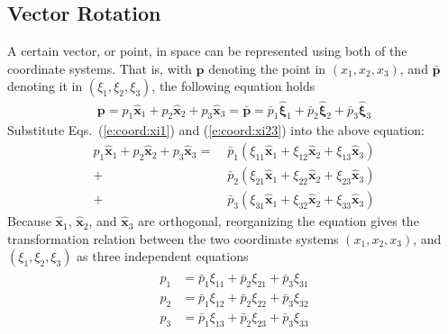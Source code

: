 \documentclass[a4paper,12pt,dvips]{article}
\begin{document}
\subsection{Vector Rotation}

A certain vector, or point, in space can be represented using both of the
coordinate systems.  That is, with $\mathbf{p}$ denoting the point in $(x_1,
x_2, x_3)$, and $\bar{\mathbf{p}}$ denoting it in $(\xi_1, \xi_2, \xi_3)$, the
following equation holds
\begin{align*}
  \mathbf{p}
  = p_1 \hat{\mathbf{x}}_1 + p_2 \hat{\mathbf{x}}_2 + p_3 \hat{\mathbf{x}}_3
  = \bar{\mathbf{p}}
  = \bar{p}_1 \hat{\boldsymbol{\xi}}_1
  + \bar{p}_2 \hat{\boldsymbol{\xi}}_2
  + \bar{p}_3 \hat{\boldsymbol{\xi}}_3
\end{align*}
Substitute Eqs.~(\ref{e:coord:xi1}) and (\ref{e:coord:xi23}) into the above
equation:
\begin{align*}
  p_1 \hat{\mathbf{x}}_1 + p_2 \hat{\mathbf{x}}_2 + p_3 \hat{\mathbf{x}}_3
  = \; 
   &\bar{p}_1 (\xi_{11} \hat{\mathbf{x}}_1 + \xi_{12} \hat{\mathbf{x}}_2
             + \xi_{13} \hat{\mathbf{x}}_3)
  \\
  + \;
   &\bar{p}_2 (\xi_{21} \hat{\mathbf{x}}_1 + \xi_{22} \hat{\mathbf{x}}_2
             + \xi_{23} \hat{\mathbf{x}}_3)
  \\
  + \;
   &\bar{p}_3 (\xi_{31} \hat{\mathbf{x}}_1 + \xi_{32} \hat{\mathbf{x}}_2
             + \xi_{33} \hat{\mathbf{x}}_3)
\end{align*}
Because $\hat{\mathbf{x}}_1$, $\hat{\mathbf{x}}_2$, and $\hat{\mathbf{x}}_3$
are orthogonal, reorganizing the equation gives the transformation relation
between the two coordinate systems $(x_1, x_2, x_3)$, and $(\xi_1, \xi_2,
\xi_3)$ as three independent equations
\begin{align}
\begin{aligned}
  p_1 &= \bar{p}_1 \xi_{11} + \bar{p}_2 \xi_{21} + \bar{p}_3 \xi_{31}
  \\
  p_2 &= \bar{p}_1 \xi_{12} + \bar{p}_2 \xi_{22} + \bar{p}_3 \xi_{32}
  \\
  p_3 &= \bar{p}_1 \xi_{13} + \bar{p}_2 \xi_{23} + \bar{p}_3 \xi_{33}
\end{aligned}
\label{e:rotrel}
\end{align}
\end{document}
